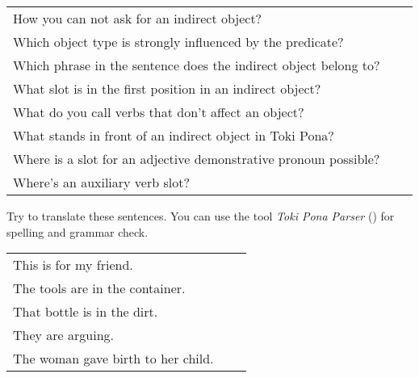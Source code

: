 \begin{supertabular}{p{5,5cm}|ll}
    How you can not ask for an indirect object?                      &  & \\
    Which object type is strongly influenced by the predicate?       &  & \\
    Which phrase in the sentence does the indirect object belong to? &  & \\
    What slot is in the first position in an indirect object?        &  & \\
    What do you call verbs that don't affect an object?              &  & \\
    What stands in front of an indirect object in Toki Pona?         &  & \\
    Where is a slot for an adjective demonstrative pronoun possible? &  & \\
    Where's an auxiliary verb slot?                                  &  & \\
\end{supertabular}

Try to translate these sentences.
You can use the tool \textit{Toki Pona Parser} (\cite{www:rowa:02}) for spelling and grammar check.

\begin{supertabular}{p{5,5cm}|ll}
    This is for my friend.             &  & \\
    The tools are in the container.    &  & \\
    That bottle is in the dirt.        &  & \\
    They are arguing.                  &  & \\
    The woman gave birth to her child. &  & \\
\end{supertabular}
